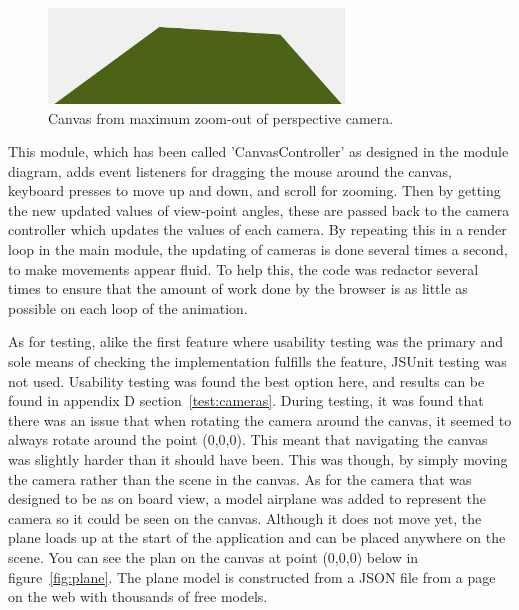 \begin{figure}[h!]
  \centering
      \includegraphics[width=0.7\textwidth]{images/zoom.png}
  \caption{Canvas from maximum zoom-out of perspective camera.}
  \label{fig:zoom}
\end{figure}

This module, which has been called 'CanvasController' as designed in the module diagram, adds event listeners for dragging the mouse around the canvas, keyboard presses to move up and down, and scroll for zooming. Then by getting the new updated values of view-point angles, these are passed back to the camera controller which updates the values of each camera. By repeating this in a render loop in the main module, the updating of cameras is done several times a second, to make movements appear fluid. To help this, the code was redactor several times to ensure that the amount of work done by the browser is as little as possible on each loop of the animation.

As for testing, alike the first feature where usability testing was the primary and sole means of checking the implementation fulfills the feature, JSUnit testing was not used. Usability testing was found the best option here, and results can be found in appendix D section~\ref{test:cameras}. During testing, it was found that there was an issue that when rotating the camera around the canvas, it seemed to always rotate around the point (0,0,0). This meant that navigating the canvas was slightly harder than it should have been. This was  though, by simply moving the camera rather than the scene in the canvas. As for the camera that was designed to be as on board view, a model airplane was added to represent the camera so it could be seen on the canvas. Although it does not move yet, the plane loads up at the start of the application and can be placed anywhere on the scene. You can see the plan on the canvas at point (0,0,0) below in figure~\ref{fig:plane}. The plane model is constructed from a JSON file from a page on the web with thousands of free models.

\clearpage

